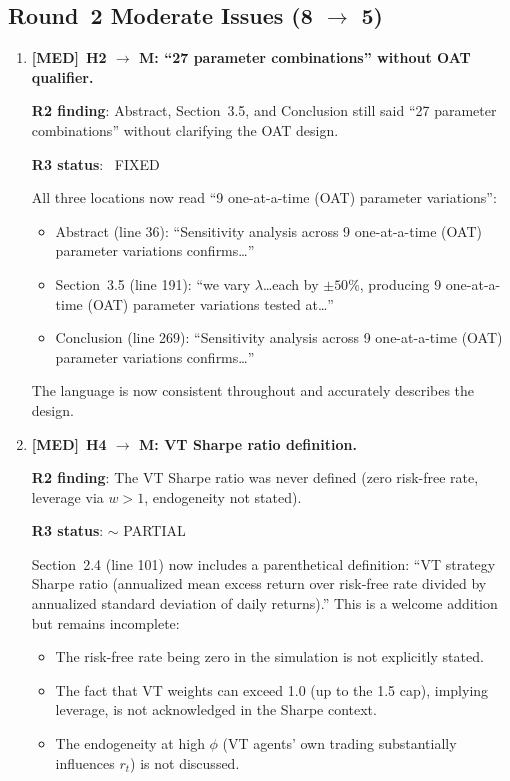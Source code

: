 \documentclass[12pt,a4paper]{article}
\newcommand{\MED}{\textbf{\textcolor{warncolor}{[MED]}}}
\newcommand{\FIXED}{\textcolor{okgreen}{\checkmark\ FIXED}}
\newcommand{\PARTIAL}{\textcolor{warncolor}{$\sim$ PARTIAL}}
\begin{document}
\medskip

\subsection*{\textcolor{warncolor}{Round~2 Moderate Issues (8 $\to$ 5)}}

\begin{enumerate}

\item \MED\ \textbf{H2 $\to$ M: ``27 parameter combinations'' without OAT qualifier.}

\textbf{R2 finding}: Abstract, Section~3.5, and Conclusion still said ``27 parameter combinations'' without clarifying the OAT design.

\textbf{R3 status}: \FIXED

All three locations now read ``9 one-at-a-time (OAT) parameter variations'':
\begin{itemize}[nosep]
  \item Abstract (line 36): ``Sensitivity analysis across 9 one-at-a-time (OAT) parameter variations confirms\ldots''
  \item Section~3.5 (line 191): ``we vary $\lambda$\ldots each by $\pm 50\%$, producing 9 one-at-a-time (OAT) parameter variations tested at\ldots''
  \item Conclusion (line 269): ``Sensitivity analysis across 9 one-at-a-time (OAT) parameter variations confirms\ldots''
\end{itemize}

The language is now consistent throughout and accurately describes the design.

\medskip

\item \MED\ \textbf{H4 $\to$ M: VT Sharpe ratio definition.}

\textbf{R2 finding}: The VT Sharpe ratio was never defined (zero risk-free rate, leverage via $w > 1$, endogeneity not stated).

\textbf{R3 status}: \PARTIAL

Section~2.4 (line 101) now includes a parenthetical definition: ``VT strategy Sharpe ratio (annualized mean excess return over risk-free rate divided by annualized standard deviation of daily returns).'' This is a welcome addition but remains incomplete:
\begin{itemize}[nosep]
  \item The risk-free rate being zero in the simulation is not explicitly stated.
  \item The fact that VT weights can exceed 1.0 (up to the 1.5 cap), implying leverage, is not acknowledged in the Sharpe context.
  \item The endogeneity at high $\phi$ (VT agents' own trading substantially influences $r_t$) is not discussed.
\end{itemize}


\end{enumerate}
\end{document}
